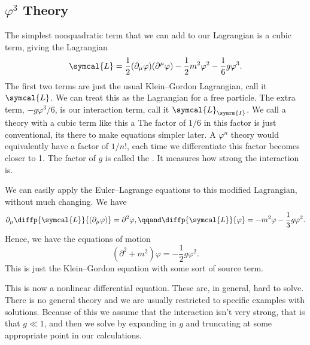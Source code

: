 \documentclass[fleqn]{NotesClass}
\newcommand{\dalembertian}{\partial^2}
\newcommand{\lagrangianDensity}{\symcal{L}}
\newcommand{\interaction}{\symrm{I}}
\begin{document}
    \subsection{\texorpdfstring{\(\varphi^3\)}{Phi Cubed} Theory}
    The simplest nonquadratic term that we can add to our Lagrangian is a cubic term, giving the Lagrangian
    \begin{equation}
        \lagrangianDensity = \frac{1}{2}(\partial_\mu \varphi) (\partial^\mu \varphi) - \frac{1}{2}m^2\varphi^2 - \frac{1}{6} g \varphi^3.
    \end{equation}
    The first two terms are just the usual Klein--Gordon Lagrangian, call it \(\lagrangianDensity\).
    We can treat this as the Lagrangian for a free particle.
    The extra term, \(-g\varphi^3/6\), is our interaction term, call it \(\lagrangianDensity_{\interaction}\).
    We call a theory with a cubic term like this a 
    The factor of \(1/6\) in this factor is just conventional, its there to make equations simpler later.
    A \(\varphi^n\) theory would equivalently have a factor of \(1/n!\), each time we differentiate this factor becomes closer to 1.
    The factor of \(g\) is called the .
    It measures how strong the interaction is.
    
    We can easily apply the Euler--Lagrange equations to this modified Lagrangian, without much changing.
    We have
    \begin{equation}
        \partial_\mu \diffp{\lagrangianDensity}{(\partial_\mu \varphi)} = \dalembertian\varphi, \qqand \diffp{\lagrangianDensity}{\varphi} = -m^2\varphi - \frac{1}{3}g \varphi^2.
    \end{equation}
    Hence, we have the equations of motion
    \begin{equation}
        (\dalembertian + m^2)\varphi = -\frac{1}{2}g \varphi^2.
    \end{equation}
    This is just the Klein--Gordon equation with some sort of source term.
    
    This is now a nonlinear differential equation.
    These are, in general, hard to solve.
    There is no general theory and we are usually restricted to specific examples with solutions.
    Because of this we assume that the interaction isn't very strong, that is that \(g \ll 1\), and then we solve by expanding in \(g\) and truncating at some appropriate point in our calculations.
    
\end{document}
